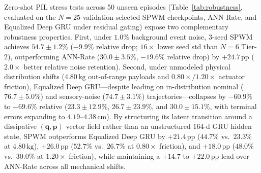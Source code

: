 \documentclass[11pt]{article}
\begin{document}
Zero-shot PIL stress tests across 50 unseen episodes (Table~\ref{tab:robustness}, evaluated on the $N=25$ validation-selected SPWM checkpoints, ANN-Rate, and Equalized Deep GRU under residual gating) expose two complementary robustness properties. First, under $1.0\%$ background event noise, 3-seed SPWM achieves $54.7 \pm 1.2\%$ ($-9.9\%$ relative drop; $16\times$ lower seed std than $N=6$ Tier-2), outperforming ANN-Rate ($30.0 \pm 3.5\%$, $-19.6\%$ relative drop) by $+24.7\,\text{pp}$ ($2.0\times$ better relative noise retention). Second, under unmodeled physical distribution shifts ($4.80\,\text{kg}$ out-of-range payloads and $0.80\times / 1.20\times$ actuator friction), Equalized Deep GRU---despite leading on in-distribution nominal ($76.7 \pm 5.0\%$) and sensory-noise ($74.7 \pm 3.1\%$) trajectories---collapses by $-60.9\%$ to $-69.6\%$ relative ($23.3 \pm 12.9\%$, $26.7 \pm 23.9\%$, and $30.0 \pm 15.1\%$, with terminal errors expanding to $4.19\text{--}4.38\,\text{cm}$). By structuring its latent transition around a dissipative $(\mathbf{q}, \mathbf{p})$ vector field rather than an unstructured $164$-d GRU hidden state, SPWM outperforms Equalized Deep GRU by $+21.4\,\text{pp}$ ($44.7\%$ vs.\ $23.3\%$ at $4.80\,\text{kg}$), $+26.0\,\text{pp}$ ($52.7\%$ vs.\ $26.7\%$ at $0.80\times$ friction), and $+18.0\,\text{pp}$ ($48.0\%$ vs.\ $30.0\%$ at $1.20\times$ friction), while maintaining a $+14.7$ to $+22.0\,\text{pp}$ lead over ANN-Rate across all mechanical shifts.
\end{document}
